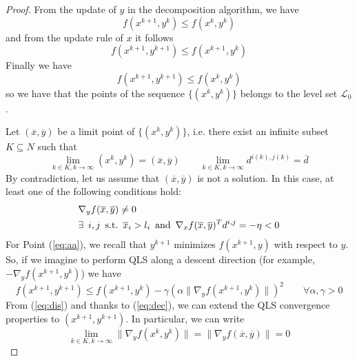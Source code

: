\begin{proof}
From the update of $y$ in the decomposition algorithm, we have
\begin{equation}
f(x^{k+1}, y^{k}) \leq f(x^{k}, y^{k})
\end{equation}
and from the update rule of $x$ it follows
\begin{equation}\label{eq:dec}
f(x^{k+1}, y^{k+1}) \leq f(x^{k+1}, y^{k})
\end{equation}
Finally we have
\begin{equation}
f(x^{k+1}, y^{k+1}) \leq f(x^{k}, y^{k})
\end{equation}
so we have that the points of the sequence $\{(x^{k}, y^{k})\}$ belongs to the level set $\mathcal{L}_0$.
\vspace{1.5cm}

Let $(\overline{x},\overline{y})$ be a limit point of $\{(x^k, y^k)\}$, i.e. there exist an infinite subset $K \subseteq N$ such that
\begin{equation}\label{eq:asim}
\lim_{k \in K, k \rightarrow \infty} (x^k, y^k) = (\overline{x},\overline{y}) \qquad \lim_{k \in K, k \rightarrow \infty} d^{i(k),j(k)} = \overline{d}
\end{equation}
By contradiction, let us assume that $(\overline{x},\overline{y})$ is not a solution. In this case, at least one of the following conditions hold:
\begin{subequations}
\begin{align}
&\nabla_y f(\overline{x},\overline{y}) \neq 0  \label{eq:aa}\\
&\exists \enskip i, j \enskip  \text{s.t.} \enskip \overline{x}_i > l_i \enskip  \text{and} \enskip  \nabla_x f(\overline{x},\overline{y})^T d^{i,j} = -\eta < 0 \label{eq:bb}
\end{align}
\end{subequations}
For Point (\ref{eq:aa}), we recall that $y^{k+1}$ minimizes $f(x^{k+1},y)$ with respect to $y$. So, if we imagine to perform QLS along a descent direction (for example, $-\nabla_y f(x^{k+1},y^{k})$) we have
\begin{equation}\label{eq:dis}
f(x^{k+1}, y^{k+1}) \leq f(x^{k+1}, y^{k}) - \gamma (\alpha \parallel \nabla_y f(x^{k+1}, y^{k}) \parallel) ^2 \qquad \forall \alpha, \gamma > 0
\end{equation}
From (\ref{eq:dis}) and thanks to (\ref{eq:dec}), we can extend the QLS convergence properties to $(x^{k+1}, y^{k+1})$. In particular, we can write
\begin{equation}
\lim_{k \in K, k \rightarrow \infty} \parallel \nabla_y f(x^{k}, y^{k}) \parallel =  \parallel \nabla_y f(\overline{x},\overline{y}) \parallel = 0

\end{equation}
\end{proof}
